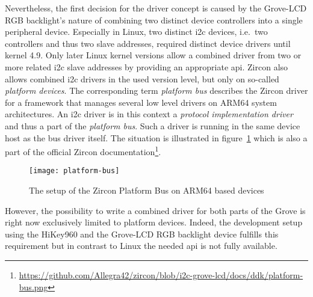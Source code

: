 Nevertheless, the first decision for the driver concept is caused by the Grove-LCD RGB backlight's nature of combining two distinct device controllers into a single peripheral device.
Especially in Linux, two distinct \ac{i2c} devices, i.e.\ two controllers and thus two slave addresses, required distinct device drivers until kernel 4.9.
Only later Linux kernel versions allow a combined driver from two or more related \ac{i2c} slave addresses by providing an appropriate \ac{api}.
Zircon also allows combined \ac{i2c} drivers in the used version level, but only on so-called \textit{platform devices}.
The corresponding term \textit{platform bus} describes the Zircon driver for a framework that manages several low level drivers on ARM64 system architectures.
An \ac{i2c} driver is in this context a \textit{protocol implementation driver} and thus a part of the \textit{platform bus}.
Such a driver is running in the same device host as the bus driver itself\cite{zircon-platformbus}.
The situation is illustrated in figure~\ref{pic:platformbus} which is also a part of the official Zircon documentation\footnote{\url{https://github.com/Allegra42/zircon/blob/i2c-grove-lcd/docs/ddk/platform-bus.png}}\cite{zircon-platformbus}.

\begin{figure} [t]
    \centering
    \texttt{[image: platform-bus]}
    \caption{The setup of the Zircon Platform Bus on ARM64 based devices\cite{zircon-platformbus}}\label{pic:platformbus}
\end{figure} 

However, the possibility to write a combined driver for both parts of the Grove is right now exclusively limited to platform devices.
Indeed, the development setup using the HiKey960 and the Grove-LCD RGB backlight device fulfills this requirement but in contrast to Linux the needed \ac{api} is not fully available.

